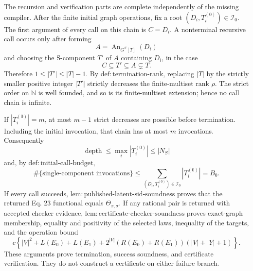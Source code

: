 The recursion and verification parts are complete independently of the missing compiler.  After the finite initial graph operations, fix a root \((D_i,T_i^{(0)})\in\mathcal I_0\).  The first argument of every call on this chain is \(C=D_i\).  A nonterminal recursive call occurs only after forming
\[
 A=\operatorname{An}_{G^S[T]}(D_i)
\]
and choosing the S-component \(T'\) of \(A\) containing \(D_i\), in the case
\[
 C\subseteq T'\subseteq A\subsetneq T.
\]
Therefore \(1\le |T'|\le |T|-1\).  By \(\mathrm{def:termination\text{-}rank}\), replacing \(|T|\) by the strictly smaller positive integer \(|T'|\) strictly decreases the finite-multiset rank \(\rho\).  The strict order on \(\mathbb N\) is well founded, and so is its finite-multiset extension; hence no call chain is infinite.

If \(|T_i^{(0)}|=m\), at most \(m-1\) strict decreases are possible before termination.  Including the initial invocation, that chain has at most \(m\) invocations.  Consequently
\[
 \operatorname{depth}\le\max_i|T_i^{(0)}|\le|N_S|
\]
and, by \(\mathrm{def:initial\text{-}call\text{-}budget}\),
\[
 \#\{\text{single-component invocations}\}
 \le\sum_{(D_i,T_i^{(0)})\in\mathcal I_0}|T_i^{(0)}|
 =B_0.
\]
If every call succeeds, \(\mathrm{lem:published\text{-}latent\text{-}sid\text{-}soundness}\) proves that the returned Eq. 23 functional equals \(\Theta_{x,\sigma}\).  If any rational pair is returned with accepted checker evidence, \(\mathrm{lem:certificate\text{-}checker\text{-}soundness}\) proves exact-graph membership, equality and positivity of the selected laws, inequality of the targets, and the operation bound
\[
 c\left\{|V|^2+L(E_0)+L(E_1)
 +2^{|V|}(R(E_0)+R(E_1))(|V|+|Y|+1)\right\}.
\]
These arguments prove termination, success soundness, and certificate verification.  They do not construct a certificate on either failure branch.